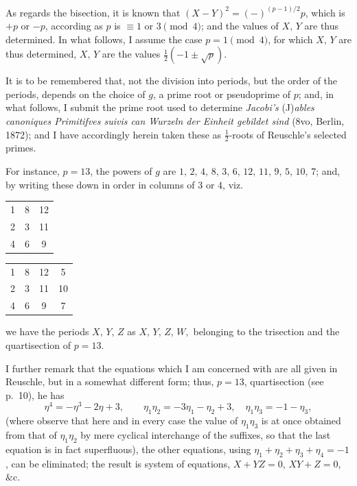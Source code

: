 \documentclass[11pt]{article}
\begin{document}
\medskip

\noindent
As regards the bisection, it is known that $(X - Y)^2 = (-)^{(p-1)/2}p$, which is $+p$ or $-p$,
according as $p$ is $\equiv 1$ or $3 \pmod 4$; and the values of $X,\,Y$ are thus determined.
In what follows, I assume the case $p = 1 \pmod 4$, for which $X,\,Y$ are thus determined,
$X,\,Y$ are the values $\frac{1}{2}(-1 \pm \sqrt{p})$.

\medskip

\noindent
It is to be remembered that, not the division into periods, but the order of the
periods, depends on the choice of $g$, a prime root or pseudoprime of $p$; and, in what
follows, I submit the prime root used to determine \textit{Jacobi's} (J)\textit{ables canoniques Primitifves
suivis can Wurzeln der Einheit gebildet sind} (8vo, Berlin, 1872); and I have accordingly
herein taken these as $\frac{1}{2}$-roots of Reuschle's selected primes.

\medskip

\noindent
For instance, $p = 13$, the powers of $g$ are $1,\,2,\,4,\,8,\,3,\,6,\,12,\,11,\,9,\,5,\,10,\,7$;
and, by writing these down in order in columns of $3$ or $4$, viz.

\medskip

\noindent
\begin{minipage}{0.3\textwidth}
\centering
\begin{tabular}{ccc}
1 & 8 & 12 \\
2 & 3 & 11 \\
4 & 6 & 9
\end{tabular}
\end{minipage}
\begin{minipage}{0.3\textwidth}
\centering
\begin{tabular}{cccc}
1 & 8 & 12 & 5\\
2 & 3 & 11 & 10\\
4 & 6 & 9 & 7
\end{tabular}
\end{minipage}

\newpage

\noindent
we have the periods $X,\,Y,\,Z$ as $X,\,Y,\,Z,\,W,$ belonging to the trisection and the
quartisection of $p = 13$.

\medskip

\noindent
I further remark that the equations which I am concerned with are all given in
Reuschle, but in a somewhat different form; thus, $p = 13$, quartisection (see p.~10), he has
\[
\eta^4 = -\eta^3 - 2\eta + 3,\qquad \eta_1 \eta_2 = -3\eta_1 - \eta_2 + 3,\quad \eta_1 \eta_3 = -1 - \eta_3,
\]
(where observe that here and in every case the value of $\eta_1 \eta_3$ is at once obtained
from that of $\eta_1 \eta_2$ by mere cyclical interchange of the suffixes, so that the last
equation is in fact superfluous), the other equations, using $\eta_1 + \eta_2 + \eta_3 + \eta_4 = -1$, can be
eliminated; the result is system of equations, $X + YZ = 0$, $XY + Z = 0$, $\&\mathrm{c.}$
\end{document}
